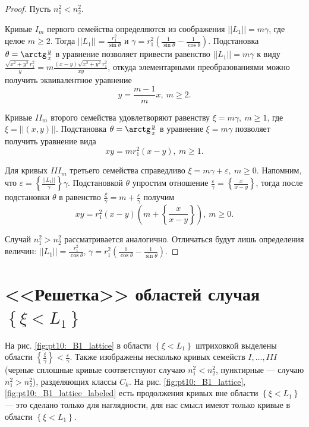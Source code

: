 \begin{proof}
Пусть $n_1^2 < n_2^2$.

Кривые $I_m$ первого семейства определяются из соображения $||L_1|| = m \gamma$, где целое $m \geq 2$. 
Тогда $||L_1|| = \frac{r_1^2}{\sin \theta}$ и $\gamma = r_1^2 \left( \frac{1}{\sin \theta} - \frac{1}{\cos \theta} \right)$.
Подстановка $\theta = \arctg \frac{y}{x}$ в уравнение позволяет привести равенство $||L_1|| = m \gamma$ к виду 
$ \frac{\sqrt{x^2 + y^2} r_1^2}{y} = m \frac{(x-y) \sqrt{x^2+y^2} r_1^2}{x y}$,
откуда элементарными преобразованиями можно получить эквивалентное уравнение 
$$y = \frac{m-1}{m} x, \ m \geq 2.$$

Кривые $II_m$ второго семейства удовлетворяют равенству $\xi = m \gamma, \ m \geq 1$, где $\xi = ||(x,y)||$.
Подстановка $\theta = \arctg \frac{y}{x}$ в уравнение $\xi = m \gamma$ позволяет получить уравнение вида 
$$x y = m r_1^2 (x-y), \ m\geq 1.$$ 

Для кривых $III_m$ третьего семейства справедливо $\xi = m \gamma + \varepsilon, \  m \geq 0$. 
Напомним, что $\varepsilon =  \left\{ \frac{||L_1||}{\gamma} \right\} \gamma$.
Подстановкой $\theta$ упростим отношение $\frac{\varepsilon}{\gamma}  = \left\{ \frac{x}{x-y} \right\}$, тогда после подстановки $\theta$  в равенство $\frac{\xi}{\gamma} = m + \frac{\varepsilon}{\gamma}$ получим
$$x y = r_1^2 (x-y) \left(  m + \left\{ \frac{x}{x-y} \right\} \right), \ m\geq 0.$$ 

Случай $n_1^2 > n_2^2$ рассматривается аналогично. Отличаться будут лишь определения величин:
$||L_1|| = \frac{r_1^2}{\cos \theta}$, $\gamma = r_1^2 \left( \frac{1}{\cos \theta} - \frac{1}{\sin \theta} \right)$. 
\end{proof}

\section{<<Решетка>> областей случая $\left\{\xi < L_1\right\}$}\label{sec:ch5/sec5}
На рис. \ref{fig:pt10:_B1_lattice} в области $\left\{\xi < L_1\right\}$ штриховкой выделены области $\left\{ \frac{\xi}{\gamma} \right\} < \frac{\varepsilon}{\gamma}$. 
Также изображены несколько кривых семейств $I, \ldots, III$ (черные сплошные кривые соответствуют случаю $n_1^2 < n_2^2$, пунктирные --- случаю $n_1^2 > n_2^2$), разделяющих классы $C_k$. 
На рис. \ref{fig:pt10:_B1_lattice}, \ref{fig:pt10:_B1_lattice_labeled} есть продолжения кривых вне области $\left\{\xi < L_1\right\}$ --- это сделано только для наглядности, для нас смысл имеют только кривые в области $\left\{\xi < L_1\right\}$.

